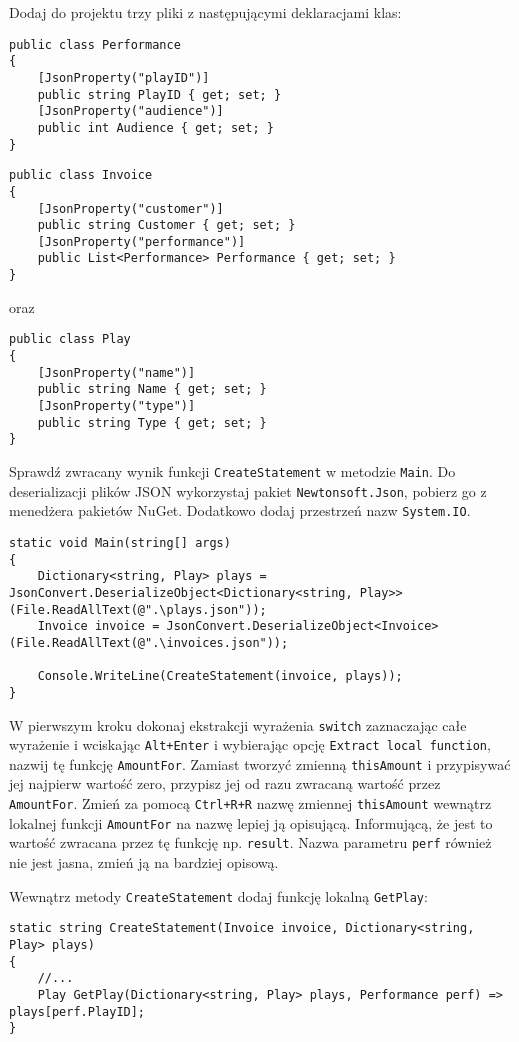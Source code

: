 Dodaj do projektu trzy pliki z następującymi deklaracjami klas:
\begin{lstlisting}[caption={Performance.cs}]
public class Performance
{
	[JsonProperty("playID")]
	public string PlayID { get; set; }
	[JsonProperty("audience")]
	public int Audience { get; set; }
}
\end{lstlisting}
\begin{lstlisting}[caption={Invoice.cs}]
public class Invoice
{
	[JsonProperty("customer")]
	public string Customer { get; set; }
	[JsonProperty("performance")]
	public List<Performance> Performance { get; set; }
}
\end{lstlisting}
oraz
\begin{lstlisting}[caption={Play.cs}]
public class Play
{
	[JsonProperty("name")]
	public string Name { get; set; }
	[JsonProperty("type")]
	public string Type { get; set; }
}
\end{lstlisting}

Sprawdź zwracany wynik funkcji \texttt{CreateStatement} w metodzie \texttt{Main}. Do deserializacji plików JSON wykorzystaj pakiet \texttt{Newtonsoft.Json}, pobierz go z menedżera pakietów NuGet. Dodatkowo dodaj przestrzeń nazw \texttt{System.IO}.
\begin{lstlisting}[caption={Play.cs}]
static void Main(string[] args)
{
	Dictionary<string, Play> plays = JsonConvert.DeserializeObject<Dictionary<string, Play>>(File.ReadAllText(@".\plays.json"));
	Invoice invoice = JsonConvert.DeserializeObject<Invoice>(File.ReadAllText(@".\invoices.json"));
	
	Console.WriteLine(CreateStatement(invoice, plays));
}
\end{lstlisting}

W pierwszym kroku dokonaj ekstrakcji wyrażenia \texttt{switch} zaznaczając całe wyrażenie i wciskając \texttt{Alt+Enter} i wybierając opcję \texttt{Extract local function}, nazwij tę funkcję \texttt{AmountFor}. Zamiast tworzyć zmienną \texttt{thisAmount} i przypisywać jej najpierw wartość zero, przypisz jej od razu zwracaną wartość przez \texttt{AmountFor}. Zmień za pomocą \texttt{Ctrl+R+R} nazwę zmiennej \texttt{thisAmount} wewnątrz lokalnej funkcji \texttt{AmountFor} na nazwę lepiej ją opisującą. Informującą, że jest to wartość zwracana przez tę funkcję np. \texttt{result}. Nazwa parametru \texttt{perf} również nie jest jasna, zmień ją na bardziej opisową.

Wewnątrz metody \texttt{CreateStatement} dodaj funkcję lokalną \texttt{GetPlay}:
\begin{lstlisting}[caption={Dodanie wyrażenia \texttt{GetPlay}}]
static string CreateStatement(Invoice invoice, Dictionary<string, Play> plays)
{
	//...
	Play GetPlay(Dictionary<string, Play> plays, Performance perf) => plays[perf.PlayID];
}
\end{lstlisting}

